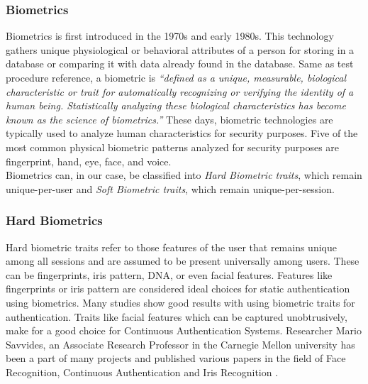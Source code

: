 \documentclass[12pt]{article}			%
\begin{document}
\subsubsection{ Biometrics }
Biometrics is first introduced in the 1970s and early 1980s. This technology gathers unique physiological or behavioral attributes of a person for storing in a database or comparing it with data already found in the database. Same as test procedure reference, a biometric is \emph{“defined as a unique, measurable, biological characteristic or trait for automatically recognizing or verifying the identity of a human being. Statistically analyzing these biological characteristics has become known as the science of biometrics.”} These days, biometric technologies are typically used to analyze human characteristics for security purposes. Five of the most common physical biometric patterns analyzed for security purposes are fingerprint, hand, eye, face, and voice.\\
Biometrics can, in our case, be classified into \emph{Hard Biometric traits}, which remain unique-per-user and \emph{Soft Biometric traits}, which remain unique-per-session.

\subsubsection{ Hard Biometrics}
Hard biometric traits refer to those features of the user that remains unique among all sessions and are assumed to be present universally among users. These can be fingerprints, iris pattern, DNA, or even facial features. Features like fingerprints or iris pattern are considered ideal choices for static authentication using biometrics. Many studies \cite{war02,john03,way97,kang06} show good results with using biometric traits for authentication. Traits like facial features which can be captured unobtrusively, make for a good choice for Continuous Authentication Systems. Researcher Mario Savvides, an Associate Research Professor in the Carnegie Mellon university has been a part of many projects and published various papers in the field of Face Recognition, Continuous Authentication and Iris Recognition \cite{marsav}. 
\end{document}
